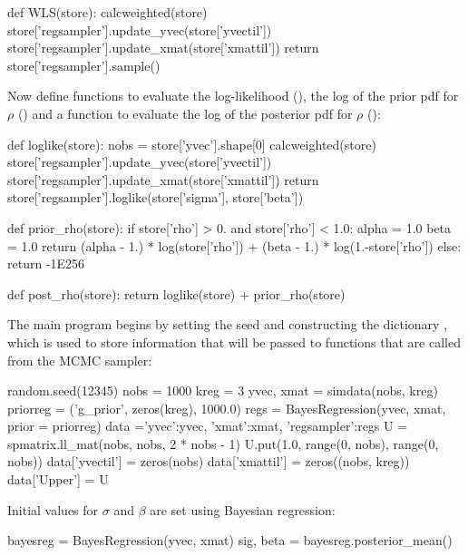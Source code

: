 \documentclass[article]{jss}
\begin{document}
\begin{Code}
def WLS(store):
    calcweighted(store)
    store['regsampler'].update_yvec(store['yvectil'])
    store['regsampler'].update_xmat(store['xmattil'])
    return store['regsampler'].sample()
\end{Code}

Now define functions to evaluate the log-likelihood (),
the log of the prior pdf for $\rho$ () and a function to evaluate the log of the posterior pdf for $\rho$ ():

\begin{Code}
def loglike(store):
    nobs = store['yvec'].shape[0]
    calcweighted(store)
    store['regsampler'].update_yvec(store['yvectil'])
    store['regsampler'].update_xmat(store['xmattil'])
    return store['regsampler'].loglike(store['sigma'], store['beta'])

def prior_rho(store):
    if store['rho'] > 0. and store['rho'] < 1.0:
        alpha = 1.0
        beta = 1.0
        return (alpha - 1.) * log(store['rho']) + (beta - 1.) * log(1.-store['rho'])
    else:
        return -1E256

def post_rho(store):
    return loglike(store) + prior_rho(store)
\end{Code}




The main program begins by setting the seed and constructing the
 dictionary , which is used to store
information that will be passed to functions that are called from the
MCMC sampler:

\begin{Code}
random.seed(12345)
nobs = 1000
kreg = 3
yvec, xmat = simdata(nobs, kreg)
priorreg = ('g_prior', zeros(kreg), 1000.0)
regs = BayesRegression(yvec, xmat, prior = priorreg)
data ={'yvec':yvec, 'xmat':xmat, 'regsampler':regs}
U = spmatrix.ll_mat(nobs, nobs, 2 * nobs - 1)
U.put(1.0, range(0, nobs), range(0, nobs))
data['yvectil'] = zeros(nobs)
data['xmattil'] = zeros((nobs, kreg))
data['Upper'] = U
\end{Code}

Initial values for $\sigma$ and $\beta$ are set using Bayesian regression:
\begin{Code}
bayesreg = BayesRegression(yvec, xmat)
sig, beta = bayesreg.posterior_mean()
\end{Code}
\end{document}
